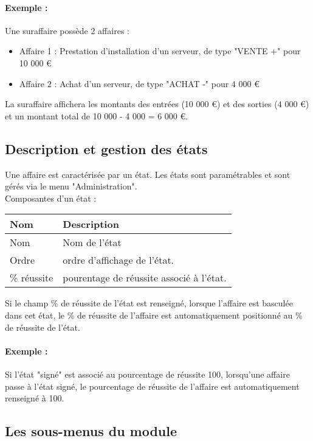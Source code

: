 \paragraph{Exemple :} Une suraffaire possède 2 affaires :
\begin{itemize}
\item Affaire 1 : Prestation d'installation d'un serveur, de type "VENTE +" pour 10 000 \euro
\item Affaire 2 : Achat d'un serveur, de type "ACHAT -" pour 4 000 \euro
\end{itemize}

La suraffaire affichera les montants des entrées (10 000 \euro) et des sorties (4 000 \euro) et un montant total de 10 000 - 4 000 = 6 000 \euro.


\subsection{Description et gestion des états}
\label{deal_state}

Une affaire est caractérisée par un état.
Les états sont paramétrables et sont gérés via le menu "Administration".\\

Composantes d'un état :\\

\begin{tabular}{|p{3cm}|p{10cm}|}
\hline
\textbf{Nom} & \textbf{Description} \\
\hline
Nom & Nom de l'état \\
\hline
Ordre & ordre d'affichage de l'état.\\
\hline
\% réussite & pourentage de réussite associé à l'état.\\
\hline
\end{tabular}
\vspace{0.3cm}

 Si le champ \% de réussite de l'état est renseigné, lorsque l'affaire est basculée dans cet état, le \% de réussite de l'affaire est automatiquement positionné au \% de réussite de l'état.

\paragraph{Exemple :} Si l'état "signé" est associé au pourcentage de réussite 100, lorsqu'une affaire passe à l'état signé, le pourcentage de réussite de l'affaire est automatiquement renseigné à 100.


\subsection{Les sous-menus du module \deal}

